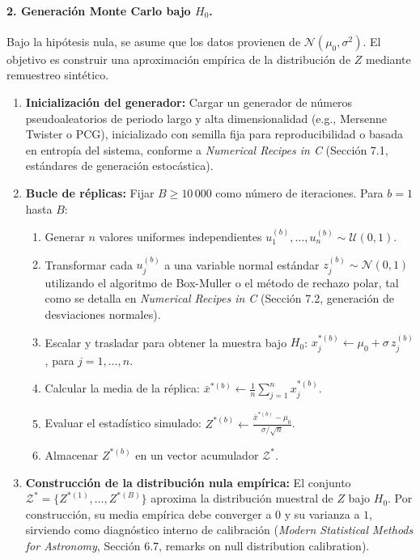 \documentclass[12pt]{article}
\begin{document}
\paragraph{2. Generación Monte Carlo bajo $H_0$.}
Bajo la hipótesis nula, se asume que los datos provienen de $\mathcal{N}(\mu_0, \sigma^2)$. El objetivo es construir una aproximación empírica de la distribución de $Z$ mediante remuestreo sintético.
\begin{enumerate}
    \item \textbf{Inicialización del generador:} Cargar un generador de números pseudoaleatorios de periodo largo y alta dimensionalidad (e.g., Mersenne Twister o PCG), inicializado con semilla fija para reproducibilidad o basada en entropía del sistema, conforme a \textit{Numerical Recipes in C} (Sección 7.1, estándares de generación estocástica).
    \item \textbf{Bucle de réplicas:} Fijar $B \geq 10\,000$ como número de iteraciones. Para $b = 1$ hasta $B$:
    \begin{enumerate}
        \item Generar $n$ valores uniformes independientes $u_{1}^{(b)}, \dots, u_{n}^{(b)} \sim \mathcal{U}(0,1)$.
        \item Transformar cada $u_{j}^{(b)}$ a una variable normal estándar $z_{j}^{(b)} \sim \mathcal{N}(0,1)$ utilizando el algoritmo de Box-Muller o el método de rechazo polar, tal como se detalla en \textit{Numerical Recipes in C} (Sección 7.2, generación de desviaciones normales).
        \item Escalar y trasladar para obtener la muestra bajo $H_0$: $x_{j}^{*(b)} \leftarrow \mu_0 + \sigma \, z_{j}^{(b)}$, para $j=1,\dots,n$.
        \item Calcular la media de la réplica: $\bar{x}^{*(b)} \leftarrow \frac{1}{n} \sum_{j=1}^n x_{j}^{*(b)}$.
        \item Evaluar el estadístico simulado: $Z^{*(b)} \leftarrow \frac{\bar{x}^{*(b)} - \mu_0}{\sigma / \sqrt{n}}$.
        \item Almacenar $Z^{*(b)}$ en un vector acumulador $\mathcal{Z}^*$.
    \end{enumerate}
    \item \textbf{Construcción de la distribución nula empírica:} El conjunto $\mathcal{Z}^* = \{Z^{*(1)}, \dots, Z^{*(B)}\}$ aproxima la distribución muestral de $Z$ bajo $H_0$. Por construcción, su media empírica debe converger a $0$ y su varianza a $1$, sirviendo como diagnóstico interno de calibración (\textit{Modern Statistical Methods for Astronomy}, Sección 6.7, remarks on null distribution calibration).
\end{enumerate}
\end{document}
